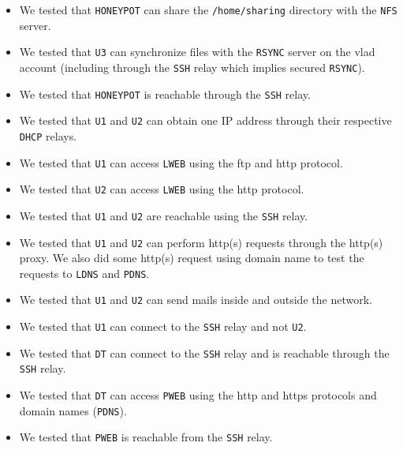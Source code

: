 \documentclass[a4paper, 11pt, oneside]{article}
\begin{document}
\begin{itemize}
    \item We tested that \texttt{HONEYPOT} can share the \texttt{/home/sharing} directory with the \texttt{NFS} server.
    \item We tested that \texttt{U3} can synchronize files with the \texttt{RSYNC} server on the vlad account (including through the \texttt{SSH} relay which implies secured \texttt{RSYNC}).
    \item We tested that \texttt{HONEYPOT} is reachable through the \texttt{SSH} relay.
    \item We tested that \texttt{U1} and \texttt{U2} can obtain one IP address through their respective \texttt{DHCP} relays.
    \item We tested that \texttt{U1} can access \texttt{LWEB} using the ftp and http protocol.
    \item We tested that \texttt{U2} can access \texttt{LWEB} using the http protocol.
    \item We tested that \texttt{U1} and \texttt{U2} are reachable using the \texttt{SSH} relay.
    \item We tested that \texttt{U1} and \texttt{U2} can perform http(s) requests through the http(s) proxy. We also did some http(s) request using domain name to test the requests to \texttt{LDNS} and \texttt{PDNS}.
    \item We tested that \texttt{U1} and \texttt{U2} can send mails inside and outside the network.
    \item We tested that \texttt{U1} can connect to the \texttt{SSH} relay and not \texttt{U2}.
    \item We tested that \texttt{DT} can connect to the \texttt{SSH} relay and is reachable through the \texttt{SSH} relay.
    \item We tested that \texttt{DT} can access \texttt{PWEB} using the http and https protocols and domain names (\texttt{PDNS}).
    \item We tested that \texttt{PWEB} is reachable from the \texttt{SSH} relay.
\end{itemize}
\end{document}
